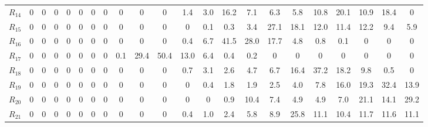 \begin{table}[h!]
\begin{tabularx}{\textwidth}{X|CCCCCCCCCCCCCCCCCCCCC}
$R_{14}$ & 0 & 0 & 0 & 0 & 0 & 0 & 0 & 0 & 0 & 0 & 1.4 & 3.0 & 16.2 & 7.1 & 6.3 & 5.8 & 10.8 & 20.1 & 10.9 & 18.4 & 0 \\
$R_{15}$ & 0 & 0 & 0 & 0 & 0 & 0 & 0 & 0 & 0 & 0 & 0 & 0.1 & 0.3 & 3.4 & 27.1 & 18.1 & 12.0 & 11.4 & 12.2 & 9.4 & 5.9 \\
$R_{16}$ & 0 & 0 & 0 & 0 & 0 & 0 & 0 & 0 & 0 & 0 & 0.4 & 6.7 & 41.5 & 28.0 & 17.7 & 4.8 & 0.8 & 0.1 & 0 & 0 & 0 \\
$R_{17}$ & 0 & 0 & 0 & 0 & 0 & 0 & 0 & 0.1 & 29.4 & 50.4 & 13.0 & 6.4 & 0.4 & 0.2 & 0 & 0 & 0 & 0 & 0 & 0 & 0 \\
$R_{18}$ & 0 & 0 & 0 & 0 & 0 & 0 & 0 & 0 & 0 & 0 & 0.7 & 3.1 & 2.6 & 4.7 & 6.7 & 16.4 & 37.2 & 18.2 & 9.8 & 0.5 & 0 \\
$R_{19}$ & 0 & 0 & 0 & 0 & 0 & 0 & 0 & 0 & 0 & 0 & 0 & 0.4 & 1.8 & 1.9 & 2.5 & 4.0 & 7.8 & 16.0 & 19.3 & 32.4 & 13.9 \\
$R_{20}$ & 0 & 0 & 0 & 0 & 0 & 0 & 0 & 0 & 0 & 0 & 0 & 0 & 0.9 & 10.4 & 7.4 & 4.9 & 4.9 & 7.0 & 21.1 & 14.1 & 29.2 \\
$R_{21}$ & 0 & 0 & 0 & 0 & 0 & 0 & 0 & 0 & 0 & 0 & 0.4 & 1.0 & 2.4 & 5.8 & 8.9 & 25.8 & 11.1 & 10.4 & 11.7 & 11.6 & 11.1 \\
\bottomrule
\end{tabularx}
\end{table}

